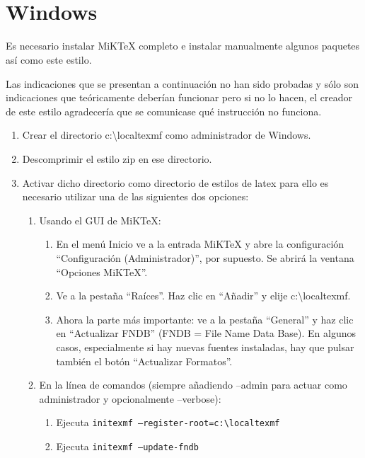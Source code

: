 \section{Windows\texorpdfstring{\textsuperscript{\texttrademark}}{™}}

Es necesario instalar MiKTeX completo e instalar manualmente algunos paquetes así como este estilo.

Las indicaciones que se presentan a continuación no han sido probadas y sólo son indicaciones que teóricamente deberían funcionar pero si no lo hacen, el creador de este estilo agradecería que se comunicase qué instrucción no funciona.

\begin{enumerate}
  \item Crear el directorio c:{\textbackslash}localtexmf como administrador de Windows.
  \item Descomprimir el estilo zip en ese directorio.
  \item Activar dicho directorio como directorio de estilos de latex para ello es necesario utilizar una de las siguientes dos opciones:
  \begin{enumerate}
    \item Usando el GUI de MiKTeX:
    \begin{enumerate}
      \item En el menú Inicio ve a la entrada MiKTeX y abre la configuración ``Configuración (Administrador)'', por supuesto. Se abrirá la ventana ``Opciones MiKTeX''.
      \item Ve a la pestaña ``Raíces''. Haz clic en ``Añadir'' y elije c:{\textbackslash}localtexmf.
      \item Ahora la parte más importante: ve a la pestaña ``General'' y haz clic en ``Actualizar FNDB'' (FNDB = File Name Data Base). En algunos casos, especialmente si hay nuevas fuentes instaladas, hay que pulsar también el botón ``Actualizar Formatos''.
    \end{enumerate}
    \item En la línea de comandos (siempre añadiendo --admin para actuar como administrador y opcionalmente --verbose):
    \begin{enumerate}
      \item Ejecuta \texttt{initexmf --register-root=c:{\textbackslash}localtexmf}
      \item Ejecuta \texttt{initexmf --update-fndb}
    \end{enumerate}
  \end{enumerate}
\end{enumerate}

